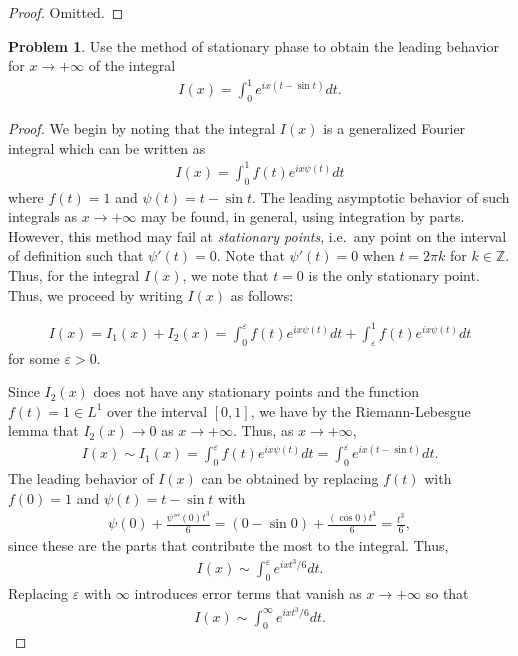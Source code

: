\documentclass[12pt]{article}
\theoremstyle{definition}
\newtheorem{problem}{Problem}
\begin{document}
\begin{proof}
  Omitted.
\end{proof}
\newpage


\begin{problem}
  Use the method of stationary phase to obtain the leading behavior for $x\to+\infty$
  of the integral
  \begin{align*}
    I(x) = \int_0^1 e^{i x (t-\sin t)} dt.
  \end{align*}
\end{problem}

\begin{proof}
  We begin by noting that the integral $I(x)$ is a generalized Fourier integral
  which can be written as
  \begin{align*}
    I(x) = \int_0^1 f(t) e^{ix\psi(t)} dt
  \end{align*}
  where $f(t) = 1$ and $\psi(t) = t - \sin t$. The leading asymptotic behavior of
  such integrals as $x\to+\infty$ may be found, in general, using integration by parts.
  However, this method may fail at \emph{stationary points}, i.e.\ any point on
  the interval of definition such that $\psi'(t) = 0$. Note that $\psi'(t) = 0$
  when $t=2 \pi k$ for $k\in \mathbb{Z}$. Thus, for the integral
  $I(x)$, we note that $t = 0$ is the only stationary point.
  Thus, we proceed by writing $I(x)$ as follows:

  \begin{align*}
    I(x) = I_1(x) + I_2(x) = \int_0^\varepsilon f(t) e^{ix\psi(t)} dt + \int_\varepsilon^1 f(t) e^{ix\psi(t)} dt
  \end{align*}
  for some $\varepsilon > 0$.

  Since $I_2(x)$ does not have any stationary points and the
  function $f(t) = 1 \in L^1$ over the interval $[0, 1]$, we have by the Riemann-Lebesgue lemma that $I_2(x) \to 0$ as $x \to +\infty$. Thus,
  as $x\to +\infty$,
  \begin{align*}
    I(x) \sim I_1(x) = \int_0^\varepsilon f(t) e^{ix\psi(t)} dt = \int_0^\varepsilon e^{ix (t-\sin t)} dt.
  \end{align*}
  The leading behavior of $I(x)$ can be obtained by replacing $f(t)$ with $f(0) = 1$
  and $\psi(t) = t - \sin t$ with
  \begin{align*}
    \psi(0) + \frac{\psi'''(0)t^3}{6} = (0 - \sin 0) + \frac{(\cos 0) t^3}{6} = \frac{t^3}{6},
  \end{align*}
  since these are the parts that contribute the most to the integral. Thus,
  \begin{align*}
    I(x) \sim \int_0^\varepsilon e^{ix t^3/6} dt.
  \end{align*}
  Replacing $\varepsilon$ with $\infty$ introduces error terms that vanish as $x \to +\infty$ so that
  \begin{align*}
    I(x) \sim \int_0^\infty e^{ix t^3/6} dt.
  \end{align*}


\end{proof}
\end{document}
